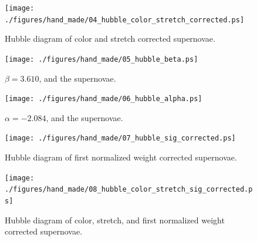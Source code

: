 \begin{figure}[ht]
\begin{center}
\texttt{[image: ./figures/hand\_made/04\_hubble\_color\_stretch\_corrected.ps]}
\end{center}
\caption{
Hubble diagram of color and stretch corrected supernovae.
}
\label{fig:hdcs}
\end{figure}
\clearpage

\begin{figure}[ht]
\begin{center}
\texttt{[image: ./figures/hand\_made/05\_hubble\_beta.ps]}
\end{center}
\caption{
$\beta=3.610$, and the supernovae.
}
\label{fig:beta}
\end{figure}
\clearpage

\begin{figure}[ht]
\begin{center}
\texttt{[image: ./figures/hand\_made/06\_hubble\_alpha.ps]}
\end{center}
\caption{
$\alpha = -2.084$, and the supernovae.
}
\label{fig:alpha}
\end{figure}
\clearpage

\begin{figure}[ht]
\begin{center}
\texttt{[image: ./figures/hand\_made/07\_hubble\_sig\_corrected.ps]}
\end{center}
\caption{
Hubble diagram of first normalized weight corrected supernovae.
}
\label{fig:hdw}
\end{figure}
\clearpage

\begin{figure}[ht]
\begin{center}
\texttt{[image: ./figures/hand\_made/08\_hubble\_color\_stretch\_sig\_corrected.ps]}
\end{center}
\caption{
Hubble diagram of color, stretch, and first normalized weight corrected supernovae.
}
\label{fig:hdcsw}
\end{figure}
\clearpage
